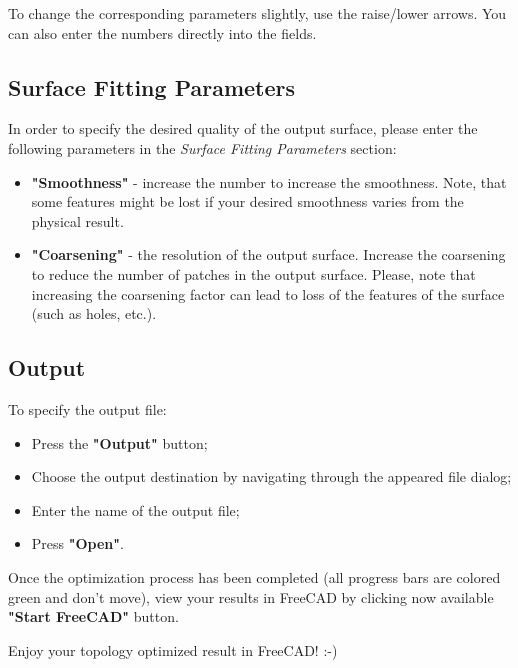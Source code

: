 \documentclass[
12pt, %
a4paper, %
oneside, %
headinclude,footinclude, %
BCOR5mm, %
]{scrartcl}
\begin{document}
To change the corresponding parameters slightly, use the raise/lower arrows. You can also enter the numbers directly into the fields.
\subsection{Surface Fitting Parameters}
In order to specify the desired quality of the output surface, please enter the following parameters in the \textit{Surface Fitting Parameters} section:
\begin{itemize}
\item \textbf{"Smoothness"} - increase the number to increase the smoothness. Note, that some features might be lost if your desired smoothness varies from the physical result.
\item \textbf{"Coarsening"} - the resolution of the output surface.  Increase the coarsening to reduce the number of patches in the output surface. Please, note that increasing the coarsening factor can lead to loss of the features of the surface (such as holes, etc.).
\end{itemize}
\subsection{Output}
To specify the output file:
\begin{itemize}
\item Press the \textbf{"Output"} button;
\item Choose the output destination by navigating through the appeared file dialog;
\item Enter the name of the output file;
\item Press \textbf{"Open"}.
\end{itemize}

Once the optimization process has been completed (all progress bars are colored green and don't move), view your results in FreeCAD by clicking now available \textbf{"Start FreeCAD"} button.

Enjoy your topology optimized result in FreeCAD! :-)
\end{document}
